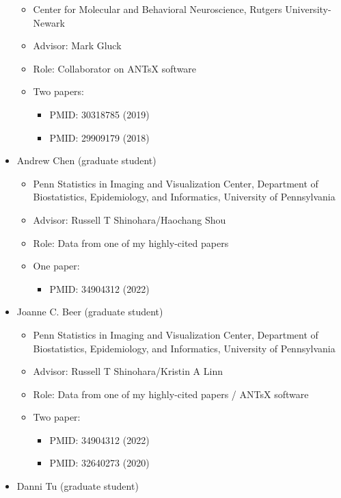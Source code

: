 \documentclass[
  11pt,
]{article}
\providecommand{\tightlist}{%
  \setlength{\itemsep}{0pt}\setlength{\parskip}{0pt}}
\begin{document}
\begin{itemize}
  \begin{itemize}
  \tightlist
  \item
    Center for Molecular and Behavioral Neuroscience, Rutgers
    University-Newark
  \item
    Advisor: Mark Gluck
  \item
    Role: Collaborator on ANTsX software
  \item
    Two papers:

    \begin{itemize}
    \tightlist
    \item
      PMID: 30318785 (2019)
    \item
      PMID: 29909179 (2018)
    \end{itemize}
  \end{itemize}
\item
  Andrew Chen (graduate student)

  \begin{itemize}
  \tightlist
  \item
    Penn Statistics in Imaging and Visualization Center, Department of
    Biostatistics, Epidemiology, and Informatics, University of
    Pennsylvania
  \item
    Advisor: Russell T Shinohara/Haochang Shou
  \item
    Role: Data from one of my highly-cited papers
  \item
    One paper:

    \begin{itemize}
    \tightlist
    \item
      PMID: 34904312 (2022)
    \end{itemize}
  \end{itemize}
\item
  Joanne C. Beer (graduate student)

  \begin{itemize}
  \tightlist
  \item
    Penn Statistics in Imaging and Visualization Center, Department of
    Biostatistics, Epidemiology, and Informatics, University of
    Pennsylvania
  \item
    Advisor: Russell T Shinohara/Kristin A Linn
  \item
    Role: Data from one of my highly-cited papers / ANTsX software
  \item
    Two paper:

    \begin{itemize}
    \tightlist
    \item
      PMID: 34904312 (2022)
    \item
      PMID: 32640273 (2020)
    \end{itemize}
  \end{itemize}
\item
  Danni Tu (graduate student)


\end{itemize}
\end{document}
